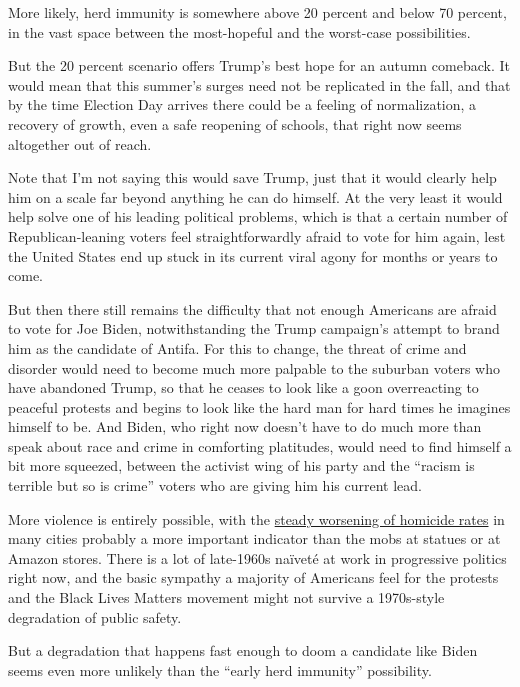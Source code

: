 More likely, herd immunity is somewhere above 20 percent and below 70
percent, in the vast space between the most-hopeful and the worst-case
possibilities.

But the 20 percent scenario offers Trump's best hope for an autumn
comeback. It would mean that this summer's surges need not be replicated
in the fall, and that by the time Election Day arrives there could be a
feeling of normalization, a recovery of growth, even a safe reopening of
schools, that right now seems altogether out of reach.

Note that I'm not saying this would save Trump, just that it would
clearly help him on a scale far beyond anything he can do himself. At
the very least it would help solve one of his leading political
problems, which is that a certain number of Republican-leaning voters
feel straightforwardly afraid to vote for him again, lest the United
States end up stuck in its current viral agony for months or years to
come.

But then there still remains the difficulty that not enough Americans
are afraid to vote for Joe Biden, notwithstanding the Trump campaign's
attempt to brand him as the candidate of Antifa. For this to change, the
threat of crime and disorder would need to become much more palpable to
the suburban voters who have abandoned Trump, so that he ceases to look
like a goon overreacting to peaceful protests and begins to look like
the hard man for hard times he imagines himself to be. And Biden, who
right now doesn't have to do much more than speak about race and crime
in comforting platitudes, would need to find himself a bit more
squeezed, between the activist wing of his party and the ``racism is
terrible but so is crime'' voters who are giving him his current lead.

More violence is entirely possible, with the
\href{https://www.nytimes3xbfgragh.onion/2020/07/06/upshot/murders-rising-crime-coronavirus.html}{steady
worsening of homicide rates} in many cities probably a more important
indicator than the mobs at statues or at Amazon stores. There is a lot
of late-1960s naïveté at work in progressive politics right now, and the
basic sympathy a majority of Americans feel for the protests and the
Black Lives Matters movement might not survive a 1970s-style degradation
of public safety.

But a degradation that happens fast enough to doom a candidate like
Biden seems even more unlikely than the ``early herd immunity''
possibility.


